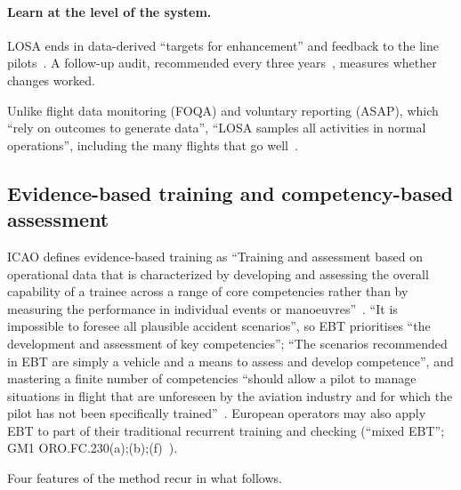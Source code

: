 \documentclass[11pt]{article}
\begin{document}
\paragraph{Learn at the level of the system.} LOSA ends in data-derived ``targets for enhancement'' and feedback to the line pilots~\cite[para.~10b(9)--(10)]{faa2006losa}. A follow-up audit, recommended every three years~\cite[para.~4c(3)]{faa2006losa}, measures whether changes worked.

Unlike flight data monitoring (FOQA) and voluntary reporting (ASAP), which ``rely on outcomes to generate data'', ``LOSA samples all activities in normal operations'', including the many flights that go well~\cite[para.~4c(1)]{faa2006losa}.

\subsection{Evidence-based training and competency-based assessment}\label{sec:ebt}

ICAO defines evidence-based training as ``Training and assessment based on operational data that is characterized by developing and assessing the overall capability of a trainee across a range of core competencies rather than by measuring the performance in individual events or manoeuvres''~\cite[Glossary]{icao2013ebt}. ``It is impossible to foresee all plausible accident scenarios'', so EBT prioritises ``the development and assessment of key competencies''; ``The scenarios recommended in EBT are simply a vehicle and a means to assess and develop competence'', and mastering a finite number of competencies ``should allow a pilot to manage situations in flight that are unforeseen by the aviation industry and for which the pilot has not been specifically trained''~\cite[Part~I, 1.3]{icao2013ebt}. European operators may also apply EBT to part of their traditional recurrent training and checking (``mixed EBT''; GM1 ORO.FC.230(a);(b);(f)~\cite{easa2026ear}).

Four features of the method recur in what follows.
\end{document}
